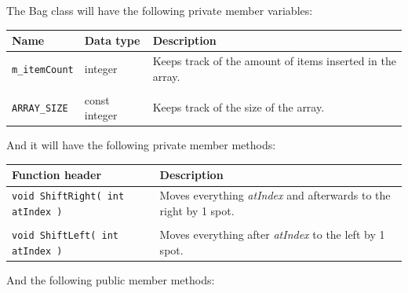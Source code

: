         The Bag class will have the following private member variables:

        \begin{center}
            \begin{tabular}{p{3cm} p{3cm} p{6cm}}
                \textbf{Name} & \textbf{Data type} & \textbf{Description}
                \\ \hline
                \texttt{m\_itemCount} & integer & Keeps track of the amount of items inserted in the array.
                \\ \\
                \texttt{ARRAY\_SIZE} & const integer & Keeps track of the size of the array.
            \end{tabular}
        \end{center}

        And it will have the following private member methods:
        
        \begin{center}
            \begin{tabular}{p{7cm} p{6cm}}
                \textbf{Function header} & \textbf{Description}
                \\ \hline
                \texttt{void ShiftRight( int atIndex )} & Moves everything \textit{atIndex} and afterwards to the right by 1 spot.
                \\ \\
                \texttt{void ShiftLeft( int atIndex )} & Moves everything after \textit{atIndex} to the left by 1 spot.
            \end{tabular}
        \end{center}

        And the following public member methods:
        
